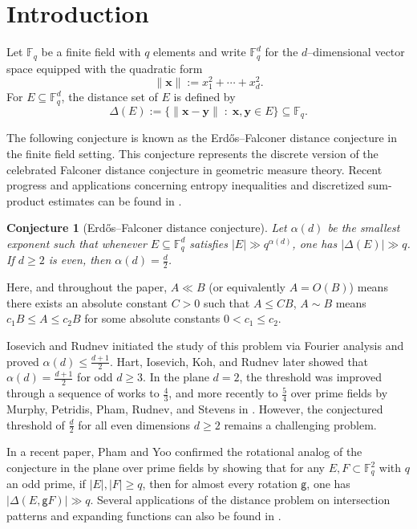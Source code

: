 \documentclass[11pt]{article}
\newtheorem{conjecture}[theorem]{Conjecture}
\def\F{\mathbb{F}}
\begin{document}
\section{Introduction}
Let $\F_q$ be a finite field with $q$ elements and write $\F_q^d$ for the $d$--dimensional vector space equipped with the quadratic form
\[
\|\mathbf{x}\|:=x_1^2+\cdots+x_d^2.
\]
For $E\subseteq\F_q^d$, the distance set of $E$ is defined by
\[
\Delta(E):=\{\|\mathbf{x}-\mathbf{y}\|\;:\;\mathbf{x},\mathbf{y}\in E\}\subseteq\F_q.
\]


The following conjecture is known as the Erd\H{o}s--Falconer distance conjecture in the finite field setting. This conjecture represents the discrete version of the celebrated Falconer distance conjecture \cite{falconer} in geometric measure theory. Recent progress and applications concerning entropy inequalities and discretized sum-product estimates can be found in \cite{Du3, Du4, alex-fal, entropy}.

\begin{conjecture}[Erd\H{o}s--Falconer distance conjecture]\label{erdf}
 Let $\alpha(d)$ be the smallest exponent such that whenever $E \subseteq \mathbb{F}_q^d$ satisfies $|E| \gg q^{\alpha(d)}$, one has $|\Delta(E)| \gg q$. If $d \geq 2$ is even, then $\alpha(d) = \frac{d}{2}$.
\end{conjecture}

Here, and throughout the paper,  $A \ll B$ (or equivalently $A = O(B)$) means there exists an absolute constant $C > 0$ such that $A \leq CB$, $A \sim B$ means $c_1 B \leq A \leq c_2 B$ for some absolute constants $0 < c_1 \leq c_2$.

Iosevich and Rudnev \cite{IR07} initiated the study of this problem via Fourier analysis and proved $\alpha(d)\le\frac{d+1}{2}$. Hart, Iosevich, Koh, and Rudnev \cite{HIKR11} later showed that $\alpha(d)=\frac{d+1}{2}$ for odd $d\ge3$. In the plane $d=2$, the threshold was improved through a sequence of works \cite{BHIPR17,CEHIK12} to $\frac{4}{3}$, and more recently to $\frac{5}{4}$ over prime fields by Murphy, Petridis, Pham, Rudnev, and Stevens in \cite{MPPRS22}. However, the conjectured threshold of $\frac{d}{2}$ for all even dimensions $d \ge 2$ remains a challenging problem.

In a recent paper, Pham and Yoo \cite{phamYoo23} confirmed the rotational analog of the conjecture in the plane over prime fields by showing that for any $E, F\subset \mathbb{F}_q^2$ with $q$ an odd prime, if $|E|, |F|\ge q$, then for almost every rotation $\mathsf{g}$, one has $|\Delta(E, \mathsf{g}F)|\gg q$. Several applications of the distance problem on intersection patterns and expanding functions can also be found in \cite{phamYoo23}. 
\end{document}

